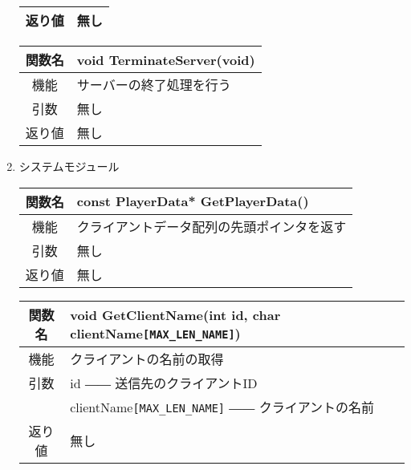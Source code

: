 \documentclass{jarticle}
\begin{document}
\begin{enumerate}
\begin{table}[H]
\begin{center}
\begin{tabular}{|c||p{30em}|}
                返り値&無し\\\hline
            \end{tabular}
        \end{center}
    \end{table}
    \begin{table}[H]
        \label{table:fanc_s1-5}
        \begin{center}
            \begin{tabular}{|c||p{30em}|}\hline
                関数名&void TerminateServer(void)  \\\hline
                機能&サーバーの終了処理を行う\\
                引数&無し\\
                返り値&無し\\\hline
            \end{tabular}
        \end{center}
    \end{table}
    \item システムモジュール
    \begin{table}[H]
        \label{table:fanc_s2-1}
        \begin{center}
            \begin{tabular}{|c||p{30em}|}\hline
                関数名&const PlayerData* GetPlayerData()\\\hline
                機能&クライアントデータ配列の先頭ポインタを返す\\
                引数&無し\\
                返り値&無し\\\hline

            \end{tabular}
        \end{center}
    \end{table}
    \begin{table}[H]
        \label{table:fanc_s2-2}
        \begin{center}
            \begin{tabular}{|c||p{30em}|}\hline
                関数名&void GetClientName(int id, char clientName\verb+[MAX_LEN_NAME]+)\\\hline
                機能&クライアントの名前の取得\\
                引数&id ―― 送信先のクライアントID\\
                &clientName\verb+[MAX_LEN_NAME]+ ―― クライアントの名前\\
                返り値&無し\\\hline


\end{tabular}
\end{center}
\end{table}
\end{enumerate}
\end{document}
